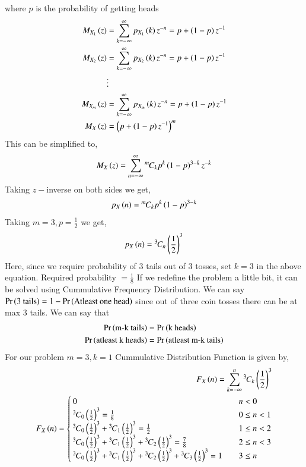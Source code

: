 \documentclass[journal]{IEEEtran}
\begin{document}
where $p$ is the probability of getting heads
\begin{align}
  M_{X_1}\left(z\right)&=\sum_{k=-\infty}^{\infty}p_{X_1}\left(k\right)z^{-n} = p + \left(1-p\right)z^{-1}\\
  M_{X_2}\left(z\right)&=\sum_{k=-\infty}^{\infty}p_{X_2}\left(k\right)z^{-n} = p + \left(1-p\right)z^{-1}\\
  &\vdots\\
  M_{X_m}\left(z\right)&=\sum_{k=-\infty}^{\infty}p_{X_m}\left(k\right)z^{-n} = p + \left(1-p\right)z^{-1}\\   M_X\left(z\right) &= \left(p + \left(1-p\right)z^{-1}\right)^{m}
\end{align}
This can be simplified to,
\begin{align}
  M_X\left(z\right) = \sum_{n=-\infty}^{\infty} {{}^{m}\mkern-1muC_{k}}p^{k}\left(1-p\right)^{3-k}z^{-k}
\end{align}
Taking $z-$inverse on both sides we get,
\begin{align}
  p_X\left(n\right) = {{}^{m}\mkern-1muC_{k}} p^{k} \left(1-p\right)^{3-k} 
\end{align}
Taking $m=3, p = \frac{1}{2}$ we get,
\begin{align}
  p_X\left(n\right) = {{}^{3}\mkern-1muC_{n}}\left(\frac{1}{2}\right)^3
\end{align}
Here, since we require probability of $3$ tails out of $3$ tosses, set $k=3$ in the above equation.\newline
Required probability $=\frac{1}{8}$\newline
If we redefine the problem a little bit, it can be solved using Cummulative Frequency Distribution. We can say $\Pr\left(\text{3 tails}\right) = 1 - \Pr\left(\text{Atleast one head}\right)$ since out of three coin tosses there can be at max $3$ tails.\newline
We can say that 
\begin{align}
  \Pr\left(\text{m-k tails}\right) &= \Pr\left(\text{k heads}\right)\\
  \Pr\left(\text{atleast k heads}\right) &= \Pr\left(\text{atleast m-k tails}\right)
\end{align}
For our problem $m=3, k=1$
Cummulative Distribution Function is given by,
\begin{align}
    F_X \left(n\right) = \sum _{k=-\infty}^{n} {{}^{3}\mkern-1muC_{k}} \left(\frac{1}{2}\right)^3\\ 
    F_{X}\left(n\right) = \begin{cases}
        0 & \quad n < 0\\
        {{}^{3}\mkern-1muC_{0}}\left(\frac{1}{2}\right)^3 = \frac{1}{8} & \quad 0 \leq n < 1\\
        {{}^{3}\mkern-1muC_{0}}\left(\frac{1}{2}\right)^3 + {{}^{3}\mkern-1muC_{1}}\left(\frac{1}{2}\right)^3 = \frac{1}{2} & \quad 1 \leq n < 2\\
        {{}^{3}\mkern-1muC_{0}}\left(\frac{1}{2}\right)^3 + {{}^{3}\mkern-1muC_{1}}\left(\frac{1}{2}\right)^3 + {{}^{3}\mkern-1muC_{2}}\left(\frac{1}{2}\right)^3 = \frac{7}{8} & \quad 2 \leq n < 3\\
        {{}^{3}\mkern-1muC_{0}}\left(\frac{1}{2}\right)^3 + {{}^{3}\mkern-1muC_{1}}\left(\frac{1}{2}\right)^3 + {{}^{3}\mkern-1muC_{2}}\left(\frac{1}{2}\right)^3 + {{}^{3}\mkern-1muC_{3}}\left(\frac{1}{2}\right)^3 = 1 & \quad 3 \leq n
    \end{cases}
\end{align}
\end{document}
